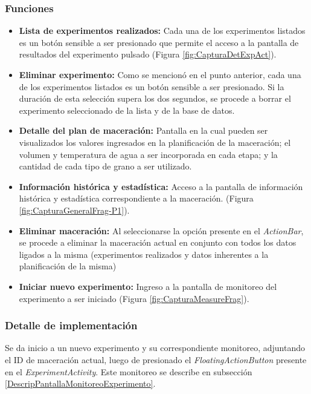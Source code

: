             \subsubsection{Funciones}
                \begin{itemize}
                    \item \textbf{Lista de experimentos realizados:} Cada una de los experimentos listados es un botón sensible a ser presionado que permite el acceso a la pantalla de resultados del experimento pulsado (Figura \ref{fig:CapturaDetExpAct}).
                    
                    \item \textbf{Eliminar experimento:} Como se mencionó en el punto anterior, cada una de los experimentos listados es un botón sensible a ser presionado. Si la duración de esta selección supera los dos segundos, se procede a borrar el experimento seleccionado de la lista y de la base de datos.
                    
                    \item \textbf{Detalle del plan de maceración:} Pantalla en la cual pueden ser visualizados los valores ingresados en la planificación de la maceración; el volumen y temperatura de agua a ser incorporada en cada etapa; y la cantidad de cada tipo de grano a ser utilizado.
                    
                    \item \textbf{Información histórica y estadística:} Acceso a la pantalla de información histórica y estadística correspondiente a la maceración. (Figura \ref{fig:CapturaGeneralFrag-P1}).
                    
                    \item \textbf{Eliminar maceración:} Al seleccionarse la opción presente en el \textit{ActionBar}, se procede a eliminar la maceración actual en conjunto con todos los datos ligados a la misma (experimentos realizados y datos inherentes a la planificación de la misma)
                    
                    \item \textbf{Iniciar nuevo experimento:} Ingreso a la pantalla de monitoreo del experimento a ser iniciado (Figura \ref{fig:CapturaMeasureFrag}).
                    
                \end{itemize}
            \subsubsection{Detalle de implementación}
                \par Se da inicio a un nuevo experimento y su correspondiente monitoreo, adjuntando el ID de maceración actual, luego de presionado el \textit{FloatingActionButton} presente en el \textit{ExperimentActivity}. Este monitoreo se describe en subsección \ref{DescripPantallaMonitoreoExperimento}.
            
